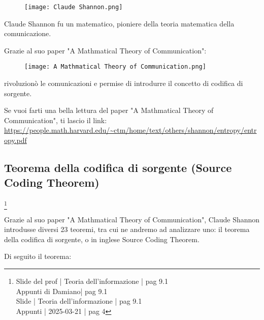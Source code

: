 \begin{figure}[h]
    \centering
    \texttt{[image: Claude Shannon.png]}
\end{figure} 

Claude Shannon fu un matematico, pioniere della teoria matematica della comunicazione. \newline 

Grazie al suo paper "A Mathmatical Theory of Communication": 

\begin{figure}[h]
    \centering
    \texttt{[image: A Mathmatical Theory of Communication.png]}
\end{figure} 

rivoluzionò le comunicazioni e permise di introdurre il concetto di codifica di sorgente. \newline 

\begin{tcolorbox}
    Se vuoi farti una bella lettura del paper "A Mathmatical Theory of Communication", ti lascio il link: \\
    \url{https://people.math.harvard.edu/~ctm/home/text/others/shannon/entropy/entropy.pdf}
\end{tcolorbox}

\newpage 

\subsection{Teorema della codifica di sorgente (Source Coding Theorem)}
\footnote{Slide del prof | Teoria dell'informazione | pag 9.1 \\  
Appunti di Damiano| pag 9.1 \\
Slide | Teoria dell'informazione | pag 9.1 \\
Appunti | 2025-03-21 | pag 4
}

Grazie al suo paper "A Mathmatical Theory of Communication", 
Claude Shannon introdusse diversi 23 teoremi, tra cui ne andremo ad analizzare uno: 
il teorema della codifica di sorgente, o in inglese Source Coding Theorem. \newline 

Di seguito il teorema: 

